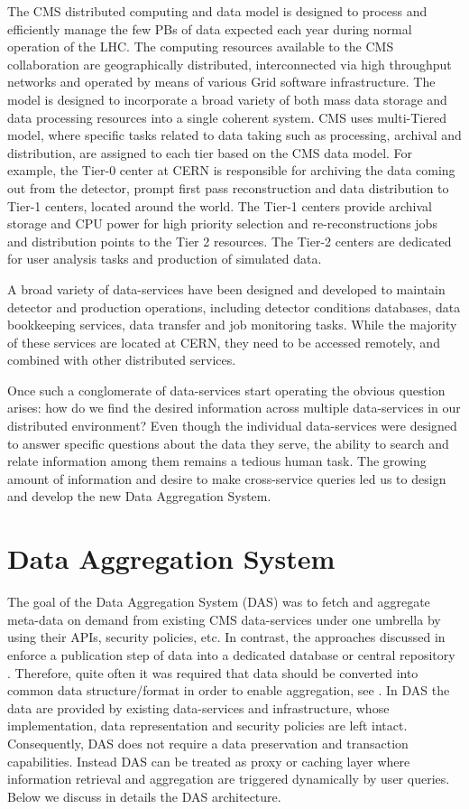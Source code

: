 \documentclass[1p,times]{elsarticle}
\begin{document}
The CMS distributed computing and data model \cite{CMSDataModel} 
is designed to process and efficiently manage the few PBs of data expected each year
during normal operation of the LHC. The computing resources available to the CMS
collaboration are geographically distributed, 
interconnected via high throughput networks and operated by means 
of various Grid software infrastructure. The model is designed to
incorporate a broad variety of both mass data storage and data processing
resources into a single coherent system. CMS uses
multi-Tiered model, where specific tasks related to data taking such as
processing, archival and distribution, are assigned to each tier based
on the CMS data model. For example, the Tier-0 center at CERN is responsible
for archiving the data coming out from the detector, prompt first pass reconstruction
and data distribution to Tier-1 centers, located around the world.
The Tier-1 centers provide archival storage and CPU power for high
priority selection and re-reconstructions jobs and distribution points
to the Tier 2 resources.
The Tier-2 centers are dedicated for user analysis tasks and production of simulated data.

A broad variety of data-services have been designed and developed to
maintain detector and production operations, including detector
conditions databases, data bookkeeping services,
data transfer and job monitoring tasks. While the majority of these
services are located at CERN, they need to be accessed remotely, and
combined with other distributed services.

Once such a conglomerate of data-services start operating the obvious
question arises: how do we find the desired information across multiple data-services
in our distributed environment? Even though the individual data-services were designed
to answer specific questions about the data they serve, the ability to search and relate
information among them remains a tedious human task. The growing amount of information
and desire to make cross-service queries led us to design and develop the new
Data Aggregation System.

\section{Data Aggregation System\label{DAS}}
The goal of the Data Aggregation System (DAS) was to fetch and aggregate meta-data 
on demand from existing CMS data-services under one umbrella by using their APIs, 
security policies, etc. In contrast, the approaches
discussed in \cite{DBXplorer, QueryAnswer, FedDB}
enforce a publication step of data into a dedicated database 
or central repository \cite{iRODS}. Therefore, quite often it was required
that data should be converted into common data structure/format in order to enable
aggregation, see \cite{OpenArchive}. In DAS the data are provided
by existing data-services and infrastructure, whose implementation,
data representation and security policies are left intact. Consequently,
DAS does not require a data preservation and transaction capabilities. 
Instead DAS can be treated as proxy or caching layer where information 
retrieval and aggregation are triggered dynamically by user queries. 
Below we discuss in details the DAS architecture.
\end{document}
